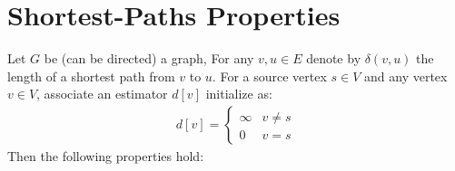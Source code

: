   \section{Shortest-Paths Properties} Let $G$ be (can be directed) a graph, For any $v,u \in E$ denote by $\delta(v,u)$ the length of a shortest path from $v$ to $u$. For a source vertex $s \in V$ and any vertex $v \in V $, associate an estimator $d[v]$ initialize as:  
  \begin{equation*}
    \begin{split}
      d[v] = \begin{cases}
        \infty & v \neq s \\
        0 & v = s
      \end{cases}
    \end{split}
  \end{equation*}
  Then the following properties hold:
